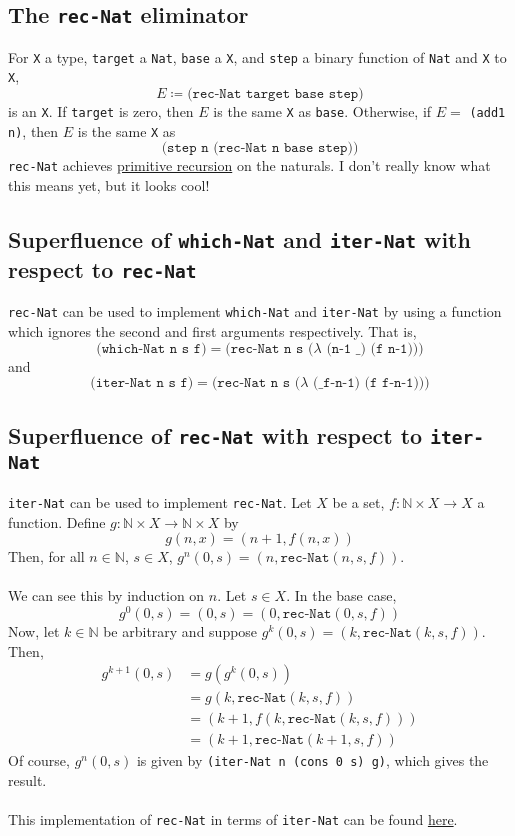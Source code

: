 \documentclass{article}
\newcommand{\ttt}[1]{\texttt{#1}}
\newcommand{\bb}[1]{\mathbb{#1}}
\newcommand{\bN}{\bb{N}}
\begin{document}
\subsection{The \ttt{rec-Nat} eliminator} \label{rec-nat-elim}
For \ttt{X} a type, \ttt{target} a \ttt{Nat}, \ttt{base} a \ttt{X}, and \ttt{step} a binary function of \ttt{Nat} and \ttt{X} to \ttt{X}, \[ E \coloneqq \ttt{(rec-Nat target base step)} \] is an \ttt{X}. If \ttt{target} is zero, then \(E\) is the same \ttt{X} as \ttt{base}. Otherwise, if \(E = \) \ttt{(add1 n)}, then \(E\) is the same \ttt{X} as \[
    \ttt{(step n (rec-Nat n base step))}
\]
\ttt{rec-Nat} achieves \href{https://en.wikipedia.org/wiki/Primitive_recursive_function}{primitive recursion} on the naturals. I don't really know what this means yet, but it looks cool!
\subsection{Superfluence of \ttt{which-Nat} and \ttt{iter-Nat} with respect to \ttt{rec-Nat}}
\ttt{rec-Nat} can be used to implement \ttt{which-Nat} and \ttt{iter-Nat} by using a function which ignores the second and first arguments respectively. That is, \[
    \ttt{(which-Nat n s f)} = \ttt{(rec-Nat n s (\(\lambda\) (n-1 \_) (f n-1)))}
\]
and \[
    \ttt{(iter-Nat n s f)} = \ttt{(rec-Nat n s (\(\lambda\) (\_ f-n-1) (f f-n-1)))}
\]
\subsection{Superfluence of \ttt{rec-Nat} with respect to \ttt{iter-Nat}}
\ttt{iter-Nat} can be used to implement \ttt{rec-Nat}. Let \(X\) be a set, \(f : \mathbb{N} \times X \to X\) a function. Define \(g : \mathbb{N} \times X \to \mathbb{N} \times X\) by \[
    g(n, x) = (n + 1, f(n, x))
\]
Then, for all \(n \in \bN\), \(s \in X\), \(g^n(0, s) = (n, \ttt{rec-Nat}(n, s, f))\).
\\ \\
We can see this by induction on \(n\). Let \(s \in X\). In the base case, \[
    g^0(0, s) = (0, s) = (0, \ttt{rec-Nat}(0, s, f))
\]
Now, let \(k \in \bN\) be arbitrary and suppose \(g^k(0, s) = (k, \ttt{rec-Nat}(k, s, f))\). Then,
\begin{align*}
    g^{k + 1}(0, s) 
        &= g(g^k(0, s)) \\
        &= g(k, \ttt{rec-Nat}(k, s, f)) \\
        &= (k + 1, f(k, \ttt{rec-Nat}(k, s, f))) \\
        &= (k + 1, \ttt{rec-Nat}(k + 1, s, f))
\end{align*}
Of course, \(g^n(0, s)\) is given by \ttt{(iter-Nat n (cons 0 s) g)}, which gives the result.
\\ \\
This implementation of \ttt{rec-Nat} in terms of \ttt{iter-Nat} can be found \hyperref[code:rec-Nat2]{here}.
\end{document}
